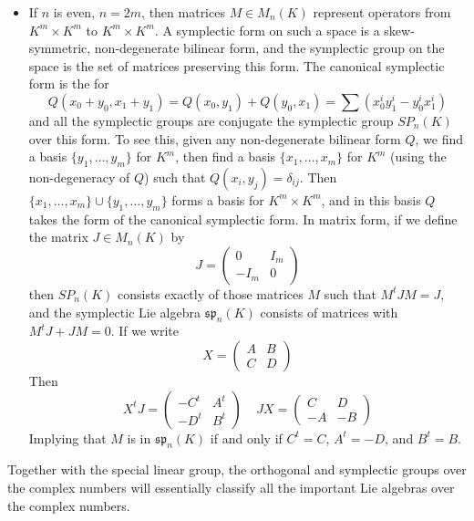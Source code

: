 \begin{example}
\begin{itemize}
        \item If $n$ is even, $n = 2m$, then matrices $M \in M_n(K)$ represent operators from $K^m \times K^m$ to $K^m \times K^m$. A symplectic form on such a space is a skew-symmetric, non-degenerate bilinear form, and the symplectic group on the space is the set of matrices preserving this form. The canonical symplectic form is the for
        \[ Q(x_0 + y_0, x_1 + y_1) = Q(x_0,y_1) + Q(y_0,x_1) = \sum (x_0^i y_1^i - y_0^i x_1^i) \]
        and all the symplectic groups are conjugate the symplectic group $SP_n(K)$ over this form. To see this, given any non-degenerate bilinear form $Q$, we find a basis $\{ y_1, \dots, y_m \}$ for $K^m$, then find a basis $\{ x_1, \dots, x_m \}$ for $K^m$ (using the non-degeneracy of $Q$) such that $Q(x_i,y_j) = \delta_{ij}$. Then $\{ x_1, \dots, x_m \} \cup \{ y_1, \dots, y_m \}$ forms a basis for $K^m \times K^m$, and in this basis $Q$ takes the form of the canonical symplectic form. In matrix form, if we define the matrix $J \in M_n(K)$ by
        \[ J = \begin{pmatrix} 0 & I_m \\ -I_m & 0 \end{pmatrix} \]
        then $SP_n(K)$ consists exactly of those matrices $M$ such that $M^tJM = J$, and the symplectic Lie algebra $\mathfrak{sp}_n(K)$ consists of matrices with $M^tJ + JM = 0$. If we write
        \[ X = \begin{pmatrix} A & B \\ C & D \end{pmatrix} \]
        Then
        \[ X^tJ = \begin{pmatrix} -C^t & A^t \\ -D^t & B^t \end{pmatrix}\ \ \ \ \ JX = \begin{pmatrix} C & D \\ -A & -B \end{pmatrix} \]
        Implying that $M$ is in $\mathfrak{sp}_n(K)$ if and only if $C^t = C$, $A^t= -D$, and $B^t = B$.
    \end{itemize}
    Together with the special linear group, the orthogonal and symplectic groups over the complex numbers will essentially classify all the important Lie algebras over the complex numbers.
\end{example}

